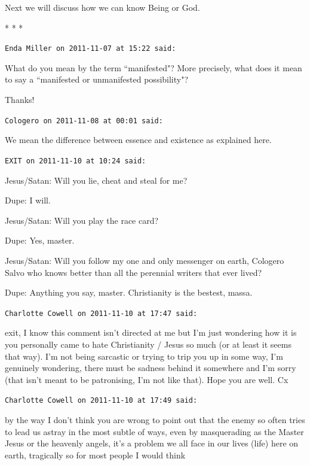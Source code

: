 Next we will discuss how we can know Being or God.




\begin{center}* * *\end{center}

\begin{footnotesize}\begin{sffamily}



\texttt{Enda Miller on 2011-11-07 at 15:22 said: }

What do you mean by the term ``manifested"? More precisely, what does it mean to say a ``manifested or unmanifested possibility"?

Thanks!


\hfill

\texttt{Cologero on 2011-11-08 at 00:01 said: }

We mean the difference between essence and existence as explained here.


\hfill

\texttt{EXIT on 2011-11-10 at 10:24 said: }

Jesus/Satan: Will you lie, cheat and steal for me?

Dupe: I will.

Jesus/Satan: Will you play the race card?

Dupe: Yes, master.

Jesus/Satan: Will you follow my one and only messenger on earth, Cologero Salvo who knows better than all the perennial writers that ever lived?

Dupe: Anything you say, master. Christianity is the bestest, massa.


\hfill

\texttt{Charlotte Cowell on 2011-11-10 at 17:47 said: }

exit, I know this comment isn't directed at me but I'm just wondering how it is you personally came to hate Christianity / Jesus so much (or at least it seems that way). I'm not being sarcastic or trying to trip you up in some way, I'm genuinely wondering, there must be sadness behind it somewhere and I'm sorry (that isn't meant to be patronising, I'm not like that). Hope you are well. Cx


\hfill

\texttt{Charlotte Cowell on 2011-11-10 at 17:49 said: }

by the way I don't think you are wrong to point out that the enemy so often tries to lead us astray in the most subtle of ways, even by masquerading as the Master Jesus or the heavenly angels, it's a problem we all face in our lives (life) here on earth, tragically so for most people I would think



\end{sffamily}
\end{footnotesize}
